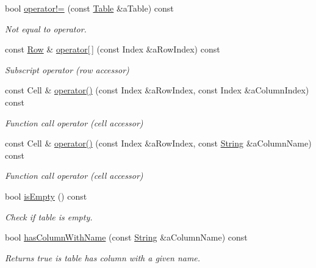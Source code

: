 \begin{DoxyCompactItemize}
bool \hyperlink{classostk_1_1core_1_1ctnr_1_1_table_a40d74d8b1bead3b99b349c65f3d377cb}{operator!=} (const \hyperlink{classostk_1_1core_1_1ctnr_1_1_table}{Table} \&a\+Table) const
\begin{DoxyCompactList}\small\item\em Not equal to operator. \end{DoxyCompactList}\item 
const \hyperlink{classostk_1_1core_1_1ctnr_1_1table_1_1_row}{Row} \& \hyperlink{classostk_1_1core_1_1ctnr_1_1_table_a7195c6f21811425473ecabfc5cc0340c}{operator\mbox{[}$\,$\mbox{]}} (const Index \&a\+Row\+Index) const
\begin{DoxyCompactList}\small\item\em Subscript operator (row accessor) \end{DoxyCompactList}\item 
const Cell \& \hyperlink{classostk_1_1core_1_1ctnr_1_1_table_aad3fbcecb674916cf50d0388031156a7}{operator()} (const Index \&a\+Row\+Index, const Index \&a\+Column\+Index) const
\begin{DoxyCompactList}\small\item\em Function call operator (cell accessor) \end{DoxyCompactList}\item 
const Cell \& \hyperlink{classostk_1_1core_1_1ctnr_1_1_table_ab86f822abd7641711455bb963cc61767}{operator()} (const Index \&a\+Row\+Index, const \hyperlink{classostk_1_1core_1_1types_1_1_string}{String} \&a\+Column\+Name) const
\begin{DoxyCompactList}\small\item\em Function call operator (cell accessor) \end{DoxyCompactList}\item 
bool \hyperlink{classostk_1_1core_1_1ctnr_1_1_table_a8e56fe6a310edb33ea1cbc69c2609ee0}{is\+Empty} () const
\begin{DoxyCompactList}\small\item\em Check if table is empty. \end{DoxyCompactList}\item 
bool \hyperlink{classostk_1_1core_1_1ctnr_1_1_table_a4c68a783ba37aa13d3b5802dd72a442d}{has\+Column\+With\+Name} (const \hyperlink{classostk_1_1core_1_1types_1_1_string}{String} \&a\+Column\+Name) const
\begin{DoxyCompactList}\small\item\em Returns true is table has column with a given name. \end{DoxyCompactList}\item 

\end{DoxyCompactItemize}
